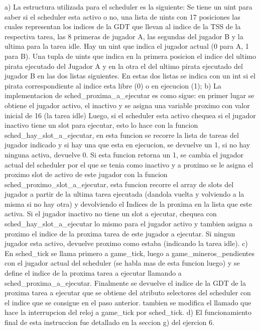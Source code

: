   a) La estructura utilizada para el scheduler es la siguiente:
    Se tiene un uint para saber si el scheduler esta activo o no, una lista de uints con 17 posiciones las cuales
    representan los indices de la GDT que llevan al indice de la TSS de la respectiva tarea, las 8 primeras de jugador A,
    las segundas del jugador B y la ultima para la tarea idle.
    Hay un uint que indica el jugador actual (0 para A, 1 para B).
    Una tupla de uints que indica en la primera posicion el indice del ultimo pirata ejecutado del Jugador A y en la otra el del
    ultimo pirata ejecutado del jugador B en las dos listas siguientes.
    En estas dos listas se indica con un int si el pirata correspondiente al indice esta libre (0) o en ejecucion (1);
  b) La implementacion de sched_proxima_a_ejecutar es como sigue:
    en primer lugar se obtiene el jugador activo, el inactivo y se asigna una variable proximo con valor inicial de 16 (la tarea idle)
    Luego, si el scheduler esta activo chequea si el jugador inactivo tiene un slot para ejecutar, esto lo hace con la
    funcion sched_hay_slot_a_ejecutar, en esta funcion se recorre la lista de tareas del jugador indicado y si hay una que esta
    en ejecucion, se devuelve un 1, si no hay ninguna activa, devuelve 0.
    Si esta funcion retorna un 1, se cambia el jugador actual del scheduler por el que se tenia como inactivo y a proximo se le asigna
    el proximo slot de activo de este jugador con la funcion sched_proximo_slot_a_ejecutar, esta funcion recorre el array de slots
    del jugador a partir de la ultima tarea ejecutada (dandola vuelta y volviendo a la misma si no hay otra) y devolviendo el Indices
    de la proxima en la lista que este activa.
    Si el jugador inactivo no tiene un slot a ejecutar, chequea con sched_hay_slot_a_ejecutar lo mismo para el jugador activo y
    tambien asigna a proximo el indice de la proxima tarea de este jugador a ejecutar.
    Si ningun jugador esta activo, devuelve proximo como estaba (indicando la tarea idle).
  c) En sched_tick se llama primero a game_tick, luego a game_mineros_pendientes con el jugador actual del scheduler (se habla mas
    de esta funcion luego) y se define el indice de la proxima tarea a ejecutar llamando a sched_proxima_a_ejecutar.
    Finalmente se devuelve el indice de la GDT de la proxima tarea a ejecutar que se obtiene del atributo selectores del scheduler
    con el indice que se consigue en el paso anterior. tambien se modifica el llamado que hace la interrupcion del reloj a game_tick
    por sched_tick.
  d) El funcionamiento final de esta instruccion fue detallado en la seccion g) del ejercion 6.
